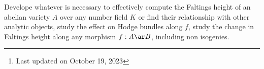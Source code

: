 \documentclass[a4paper, twoside]{article}
\title{\tbf{Faltings height of abelian varieties}}
\author{Cong Wen, 05/2023}
\date{}
\begin{document}
\maketitle
\thispagestyle{empty}
\begin{abstract}
	This is my self-use notes\footnote{Last updated on October 19, 2023} to understand arithmetic topics around .

	Please reach out if you find anything incorrect.

\end{abstract}
\tableofcontents




 Develope whatever is necessary to effectively compute the Faltings height of an abelian variety $A$ over any number field $K$ or find their relationship with other analytic objects, study the effect on Hodge bundles along $f$, study the change in Faltings height along any morphism $f:A\ar B$, including non isogenies.
\end{document}
